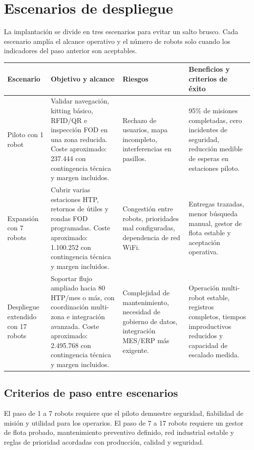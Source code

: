 \chapter{Escenarios de despliegue}

La implantación se divide en tres escenarios para evitar un salto brusco. Cada escenario amplía el alcance operativo y el número de robots solo cuando los indicadores del paso anterior son aceptables.

\begin{longtable}{P{0.18\textwidth}P{0.25\textwidth}P{0.22\textwidth}P{0.25\textwidth}}
\toprule
Escenario & Objetivo y alcance & Riesgos & Beneficios y criterios de éxito\\
\midrule
\endhead
Piloto con 1 robot & Validar navegación, kitting básico, RFID/QR e inspección FOD en una zona reducida. Coste aproximado: 237.444 \texteuro{} con contingencia técnica y margen incluidos. & Rechazo de usuarios, mapa incompleto, interferencias en pasillos. & 95\% de misiones completadas, cero incidentes de seguridad, reducción medible de esperas en estaciones piloto.\\
Expansión con 7 robots & Cubrir varias estaciones HTP, retornos de útiles y rondas FOD programadas. Coste aproximado: 1.100.252 \texteuro{} con contingencia técnica y margen incluidos. & Congestión entre robots, prioridades mal configuradas, dependencia de red WiFi. & Entregas trazadas, menor búsqueda manual, gestor de flota estable y aceptación operativa.\\
Despliegue extendido con 17 robots & Soportar flujo ampliado hacia 80 HTP/mes o más, con coordinación multi-zona e integración avanzada. Coste aproximado: 2.495.768 \texteuro{} con contingencia técnica y margen incluidos. & Complejidad de mantenimiento, necesidad de gobierno de datos, integración MES/ERP más exigente. & Operación multi-robot estable, registros completos, tiempos improductivos reducidos y capacidad de escalado medida.\\
\bottomrule
\end{longtable}

\section{Criterios de paso entre escenarios}

El paso de 1 a 7 robots requiere que el piloto demuestre seguridad, fiabilidad de misión y utilidad para los operarios. El paso de 7 a 17 robots requiere un gestor de flota probado, mantenimiento preventivo definido, red industrial estable y reglas de prioridad acordadas con producción, calidad y seguridad.
